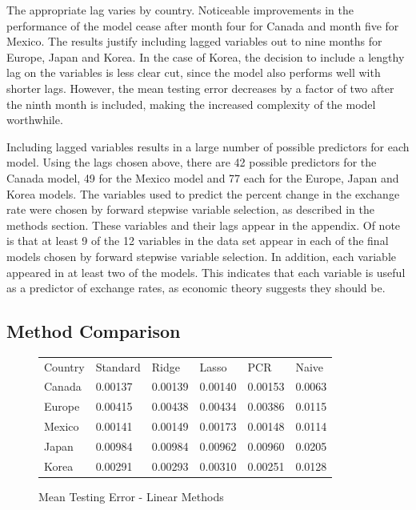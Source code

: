 \documentclass{sig-alternate-05-2015}
\begin{document}
\par{} The appropriate lag varies by country. Noticeable improvements in the performance of the model cease after month four for Canada and month five for Mexico. The results justify including lagged variables out to nine months for Europe, Japan and Korea. In the case of Korea, the decision to include a lengthy lag on the variables is less clear cut, since the model also performs well with shorter lags. However, the mean testing error decreases by a factor of two after the ninth month is included, making the increased complexity of the model worthwhile.
\par{} Including lagged variables results in a large number of possible predictors for each model. Using the lags chosen above, there are 42 possible predictors for the Canada model, 49 for the Mexico model and 77 each for the Europe, Japan and Korea models. The variables used to predict the percent change in the exchange rate were chosen by forward stepwise variable selection, as described in the methods section. These variables and their lags appear in the appendix. Of note is that at least 9 of the 12 variables in the data set appear in each of the final models chosen by forward stepwise variable selection. In addition, each variable appeared in at least two of the models. This indicates that each variable is useful as a predictor of exchange rates, as economic theory suggests they should be.

\subsection{Method Comparison}

\begin{figure}
\centering
\caption{Mean Testing Error - Linear Methods}
\begin{tabular}{l l l l l l}
Country	& Standard 	& Ridge 		& Lasso 		& PCR 		& Naive \\
Canada 	& 0.00137 	& 0.00139 	& 0.00140 	& 0.00153 	& 0.0063 \\
Europe	& 0.00415 	& 0.00438 	& 0.00434 	& 0.00386 	& 0.0115 \\
Mexico	& 0.00141 	& 0.00149 	& 0.00173 	& 0.00148  & 0.0114 \\
Japan	& 0.00984 	& 0.00984 	& 0.00962 	& 0.00960  & 0.0205 \\
Korea	& 0.00291 	& 0.00293 	& 0.00310 	& 0.00251 	& 0.0128 \\
\end{tabular}
\label{tab:comparison}
\end{figure}
\end{document}
